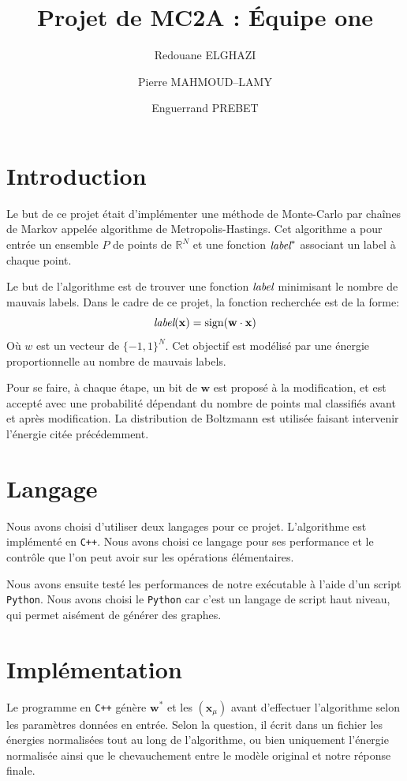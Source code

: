 \documentclass[twocolumn]{article}
\date{}
\author{Redouane ELGHAZI \and Pierre MAHMOUD--LAMY \and Enguerrand PREBET}
\title{Projet de MC2A : Équipe one}
\begin{document}
	\maketitle
	\section{Introduction}
		Le but de ce projet était d'implémenter une méthode de Monte-Carlo par chaînes de Markov appelée algorithme de Metropolis-Hastings. Cet algorithme a pour entrée un ensemble $P$ de points de $\mathbb{R}^N$ et une fonction $\emph{label}^*$ associant un label à chaque point.
		
		Le but de l'algorithme est de trouver une fonction $\emph{label}$ minimisant le nombre de mauvais labels. Dans le cadre de ce projet, la fonction recherchée est de la forme:
		$$\emph{label}(\mathbf{x}) = \text{sign}(\mathbf{w}\cdot \mathbf{x})$$
		Où $w$ est un vecteur de $\big\{{-1},1\big\}^N$. Cet objectif est modélisé par une énergie proportionnelle au nombre de mauvais labels.
		
		Pour se faire, à chaque étape, un bit de $\mathbf{w}$ est proposé à la modification, et est accepté avec une probabilité dépendant du nombre de points mal classifiés avant et après modification. La distribution de Boltzmann est utilisée faisant intervenir l'énergie citée précédemment.
	\section{Langage}
		Nous avons choisi d'utiliser deux langages pour ce projet. L'algorithme est implémenté en \verb!C++!. Nous avons choisi ce langage pour ses performance et le contrôle que l'on peut avoir sur les opérations élémentaires.
		
		Nous avons ensuite testé les performances de notre exécutable à l'aide d'un script \verb!Python!. Nous avons choisi le \verb!Python! car c'est un langage de script haut niveau, qui permet aisément de générer des graphes.
		
	\section{Implémentation}
		Le programme en \verb|C++| génère $\mathbf{w}^*$ et les $(\mathbf{x}_\mu)$ avant d'effectuer l'algorithme selon les paramètres données en entrée. Selon la question, il écrit dans un fichier les énergies normalisées tout au long de l'algorithme, ou bien uniquement l'énergie normalisée ainsi que le chevauchement entre le modèle original et notre réponse finale.
		
\end{document}
